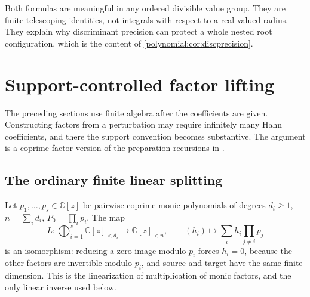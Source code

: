 \documentclass[11pt,letterpaper]{article}
\numberwithin{equation}{section}
\theoremstyle{definition}
\theoremstyle{remark}\newtheorem{remark}[theorem]{Remark}
\newcommand{\C}{\mathbb C}
\begin{document}
Both formulas are meaningful in any ordered divisible value group. They are
finite telescoping identities, not integrals with respect to a real-valued
radius. They explain why discriminant precision can protect a whole nested
root configuration, which is the content of
\cref{polynomial:cor:discprecision}.

\section{Support-controlled factor lifting}\label{polynomial:sec:hensel}
The preceding sections use finite algebra after the coefficients are given.
Constructing factors from a perturbation may require infinitely many Hahn
coefficients, and there the support convention becomes substantive. The
argument is a coprime-factor version of the preparation recursions in
\cite{polynomial:SourceAnalysis,polynomial:SourceGlobal}.

\subsection{The ordinary finite linear splitting}
Let $p_1,\ldots,p_s\in\C[z]$ be pairwise coprime monic polynomials of degrees
$d_i\ge1$, $n=\sum_id_i$, $P_0=\prod_ip_i$. The map
\begin{equation}\label{polynomial:eq:factorlinear}
 L:\bigoplus_{i=1}^s\C[z]_{<d_i}\longrightarrow\C[z]_{<n},
 \qquad (h_i)\longmapsto\sum_ih_i\prod_{j\ne i}p_j
\end{equation}
is an isomorphism: reducing a zero image modulo $p_i$ forces $h_i=0$, because
the other factors are invertible modulo $p_i$, and source and target have the
same finite dimension. This is the linearization of multiplication of monic
factors, and the only linear inverse used below.
\end{document}
